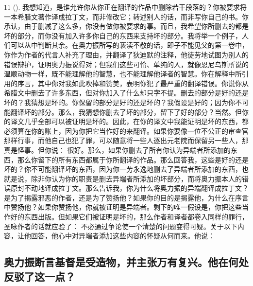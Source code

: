 11 (). 我想知道，是谁允许你从你正在翻译的作品中删除若干段落的？你被要求将一本希腊文著作译成拉丁文，而非修改它；转述别人的话，而非写你自己的书。你承认，由于删减了这么多，你没有做你被要求的事。而且，我希望你所删去的都是坏的部分，而你没有加入许多你自己的东西来支持坏的部分。我将举一个例子，人们可以从中判断其余。在奥力振所写的亵渎不敬的话，即子不能见父的第一卷中，你作为作者的代言人补充了理由，并翻译了狄迪默的注释，他徒劳地试图为别人的错误辩护，证明奥力振说得对；但我们这些可怜、单纯的人，就像恩尼乌斯所说的温顺动物一样，既不能理解他的智慧，也不能理解他译者的智慧。你在解释中所引用的序言，其中你对我如此吹捧和赞美，表明你犯了最严重的翻译错误。你说你从希腊文中删去了许多东西，但对你加入了什么却只字不提。删去的部分是好的还是坏的？我猜想是坏的。你保留的部分是好的还是坏的？我假设是好的；因为你不可能翻译坏的部分。那么，我猜想你删去了坏的部分，留下了好的部分？当然。但你的译文几乎全部可以被证明是坏的。因此，在你的译文中我能证明是坏的东西，都必须算在你的账上，因为你把它当作好的来翻译。如果你要像一位不公正的审查官那样行事，而他自己也犯了罪，可以随意将一些人逐出元老院而保留另一些人，那真是怪事。但你说： 很好。那么，如果你删去了所有你认为异端者所添加的东西，那么你留下的所有东西都属于你所翻译的作品。那么回答我，这些是好的还是坏的？你不可能翻译坏的东西，因为你一劳永逸地删去了异端者所添加的东西，也就是说，除非你认为你的职责是删去异端者所添加的坏部分，而将奥力振本人的错误原封不动地译成拉丁文。那么告诉我，你为什么将奥力振的异端翻译成拉丁文？是为了揭露邪恶的作者，还是为了赞扬他？如果你的目的是揭露他，为什么在序言中赞扬他？如果你赞扬他，你就被证明是异端者。剩下的唯一假设是，你把这些当作好的东西出版。但如果它们被证明是坏的，那么作者和译者都卷入同样的罪行，圣咏作者的话就应验了： 不必通过争论使一个清楚的问题变得可疑。关于以下内容，让他回答，他心中对异端者添加这些内容的怀疑从何而来。他说：\par


\subsection{奥力振断言基督是受造物，并主张万有复兴。他在何处反驳了这一点？}

